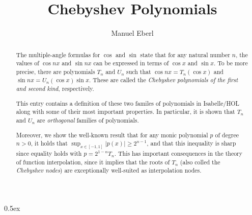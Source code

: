 \documentclass[11pt,a4paper]{article}
\begin{document}
\title{Chebyshev Polynomials}
\author{Manuel Eberl}
\maketitle

\begin{abstract}
The multiple-angle formulas for $\cos$ and $\sin$ state that for any natural number $n$, 
the values of $\cos nx$ and $\sin nx$ can be expressed in terms of $\cos x$ and $\sin x$.
To be more precise, there are polynomials $T_n$ and $U_n$ such that $\cos nx = T_n(\cos x)$
and $\sin nx = U_n(\cos x)\sin x$. These are called the \emph{Chebyshev polynomials of the
first and second kind}, respectively.

This entry contains a definition of these two familes of polynomials in Isabelle/HOL
along with some of their most important properties. In particular, it is shown that $T_n$ and $U_n$
are \emph{orthogonal} families of polynomials.

Moreover, we show the well-known result that for any monic polynomial $p$ of degree $n > 0$,
it holds that $\sup_{x\in[-1,1]} |p(x)| \geq 2^{n-1}$, and that this inequality is sharp since
equality holds with $p = 2^{1-n} T_n$. This has important consequences in the theory of
function interpolation, since it implies that the roots of $T_n$ (also colled the
\emph{Chebyshev nodes}) are exceptionally well-suited as interpolation nodes.
\end{abstract}


\newpage
\tableofcontents

\newpage
\parindent 0pt\parskip 0.5ex



\nocite{mason2002chebyshev}
\raggedright


\end{document}

